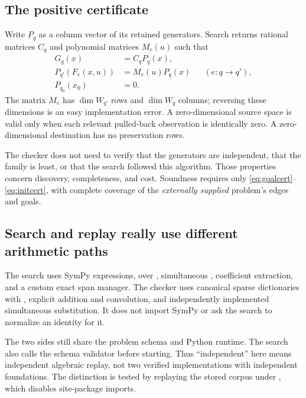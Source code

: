 \subsection{The positive certificate}
Write $P_q$ as a column vector of its retained generators. Search returns
rational matrices $C_q$ and polynomial matrices $M_e(u)$ such that
\begin{align}
 G_q(x)&=C_qP_q(x),\label{eq:goalcert}\\
 P_{q'}(F_e(x,u))&=M_e(u)P_q(x)
 &&(e:q\to q'),\label{eq:edgecert}\\
 P_{q_0}(x_0)&=0.\label{eq:initcert}
\end{align}
The matrix $M_e$ has $\dim W_{q'}$ rows and $\dim W_q$ columns; reversing
these dimensions is an easy implementation error. A zero-dimensional source
space is valid only when each relevant pulled-back observation is identically
zero. A zero-dimensional destination has no preservation rows.

The checker does not need to verify that the generators are independent, that
the family is least, or that the search followed this algorithm. Those
properties concern discovery, completeness, and cost. Soundness requires only
\eqref{eq:goalcert}--\eqref{eq:initcert}, with complete coverage of the
\emph{externally supplied} problem's edges and goals.

\subsection{Search and replay really use different arithmetic paths}
The search uses SymPy expressions,  over , simultaneous
, coefficient extraction, and a custom exact span manager. The
checker uses canonical sparse dictionaries with ,
explicit addition and convolution, and independently implemented simultaneous
substitution. It does not import SymPy or ask the search to normalize an
identity for it.

The two sides still share the problem schema and Python runtime. The search
also calls the schema validator before starting. Thus ``independent'' here
means independent algebraic replay, not two verified implementations with
independent foundations. The distinction is tested by replaying the stored
corpus under , which disables site-package imports.
